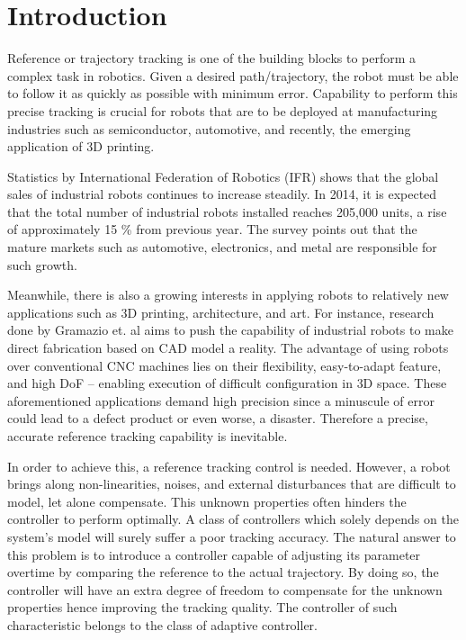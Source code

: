 %
\chapter{Introduction} \label{chap::intro}
Reference or trajectory tracking is one of the building blocks to perform a complex task in robotics. Given a desired path/trajectory, the robot must be able to follow it as quickly as possible with minimum error. Capability to perform this precise tracking is crucial for robots that are to be deployed at manufacturing industries such as semiconductor, automotive, and recently, the emerging application of 3D printing. 

Statistics by International Federation of Robotics (IFR) \cite{IFR2014} shows that the global sales of industrial robots continues to increase steadily. In 2014, it is expected that the total number of industrial robots installed reaches 205,000 units, a rise of approximately 15 \% from previous year. The survey points out that the mature markets such as automotive, electronics, and metal are responsible for such growth. 

Meanwhile, there is also a growing interests in applying robots to relatively new applications such as 3D printing, architecture, and art. For instance, research done by Gramazio et. al \cite{Helm2014} \cite{Lloret2014} aims to push the capability of industrial robots to make direct fabrication based on CAD model a reality. The advantage of using robots over conventional CNC machines lies on their flexibility, easy-to-adapt feature, and high \ac{DoF} -- enabling execution of difficult configuration in \ac{3D} space. These aforementioned applications demand high precision since a minuscule of error could lead to a defect product or even worse, a disaster. Therefore a precise, accurate reference tracking capability is inevitable.

In order to achieve this, a reference tracking control is needed. However, a robot brings along non-linearities, noises, and external disturbances that are difficult to model, let alone compensate. This unknown properties often hinders the controller to perform optimally. A class of controllers which solely depends on the system's model will surely suffer a poor tracking accuracy. The natural answer to this problem is to introduce a controller capable of adjusting its parameter overtime by comparing the reference to the actual trajectory. By doing so, the controller will have an extra degree of freedom to compensate for the unknown properties hence improving the tracking quality. The controller of such characteristic belongs to the class of adaptive controller.


